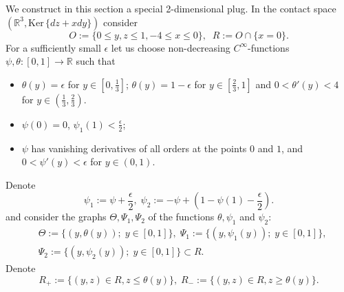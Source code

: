 \documentclass[12pt]{amsart}
\theoremstyle{plain}
\theoremstyle{definition}
\theoremstyle{remark}
\newcommand{\R}{\mathbb{R}}
\newcommand{\eps}{\epsilon}
\newcommand{\Ker}{\mathrm{Ker\,}}
\begin{document}
We  construct in this section  a  special 2-dimensional plug. 
In  the  contact  space $(\R^3, \Ker\{dz+xdy\})$ consider
  $$ O :=\{0\leq y, z\leq 1,  -4\leq x\leq 0\} ,\;\;R:= O \cap\{x=0\}.$$
For a   sufficiently small $\eps$  let us choose     non-decreasing  $C^\infty$-functions $\psi, \theta:[0,1]\to\R$ such that
\begin{itemize}
\item  $ \theta(y)=  \eps$ for $y\in[0,\frac13]$; $ \theta(y)=1- \eps$ for $y\in[\frac23,1]$ and 
$0<\theta'(y)<4$ for $y\in(\frac13,\frac23)$.
\item  $\psi(0)=0$, $\psi_1(1)<\frac\eps2$;
\item $\psi$  has  vanishing   derivatives of all orders at the points $0$ and $1$, and  $0< \psi'(y)< \eps$ for $y\in(0,1)$. 
\end{itemize} 
  Denote $$\psi_1:=\psi+\frac\eps2,\;
   \psi_2:=-\psi+(1-\psi(1)-\frac\eps2).
   $$ and consider the graphs
 $\Theta, \Psi_1, \Psi_2$   of the functions $\theta,\psi_1$ and $\psi_2$:
  \begin{align*}
  &\Theta:=\{(y,\theta(y));\;y\in[0,1]\},\;
  \Psi_1:=\{(y,\psi_1(y)); \; y\in[0,1]\},\\
 & \Psi_2:=\{(y,\psi_2(y)) ;\; y\in[0,1]\}\subset R.
  \end{align*}
 Denote $$R_+:=\{(y,z)\in R, z\leq\theta(y)\}, \; R_-:=\{(y,z)\in R, z\geq\theta(y)\}.$$
 
\end{document}
